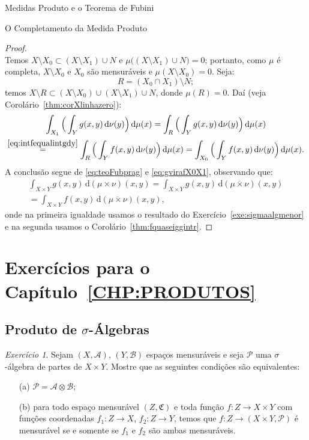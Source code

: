 \documentclass[oneside,final,11pt]{amsbook}
\newcommand{\dd}{\mathrm d}
\theoremstyle{remark}\newtheorem{exercise}{Exercício}[chapter]
\theoremstyle{remark}\newtheorem{*exercise}[exercise]{\hbox to 0pt{\hskip 0pt minus 1fil*}Exercício}
\theoremstyle{definition}\newtheorem{exdefin}{Definição}[chapter]
\theoremstyle{plain}\newtheorem{teo}{Teorema}[section]
\theoremstyle{plain}\newtheorem{lem}[teo]{Lema}
\theoremstyle{plain}\newtheorem{prop}[teo]{Proposição}
\theoremstyle{plain}\newtheorem{cor}[teo]{Corolário}
\theoremstyle{definition}\newtheorem{defin}[teo]{Definição}
\theoremstyle{remark}\newtheorem{rem}[teo]{Observação}
\theoremstyle{definition}\newtheorem{notation}[teo]{Notação}
\theoremstyle{definition}\newtheorem{convention}[teo]{Convenção}
\theoremstyle{definition}\newtheorem{example}[teo]{Exemplo}
\numberwithin{section}{chapter}
\numberwithin{equation}{section}
\begin{document}
\begin{chapter}{Medidas Produto e o Teorema de Fubini}
\begin{section}{O Completamento da Medida Produto}
\begin{proof}
\begin{equation}
\end{equation}
Temos $X\setminus X_0\subset(X\setminus X_1)\cup N$ e $\mu\big((X\setminus X_1)\cup N\big)=0$; portanto,
como $\mu$ é completa, $X\setminus X_0$ e $X_0$ são mensuráveis e $\mu(X\setminus X_0)=0$. Seja:
\[R=(X_0\cap X_1)\setminus N;\]
temos $X\setminus R\subset(X\setminus X_0)\cup(X\setminus X_1)\cup N$,
donde $\mu(R)=0$. Daí (veja Corolário~\ref{thm:corXlinhazero}):
\begin{multline}\label{eq:gvirafX0X1}
\int_{X_1}\Big(\int_Yg(x,y)\,\dd\nu(y)\Big)\,\dd\mu(x)=
\int_R\Big(\int_Yg(x,y)\,\dd\nu(y)\Big)\,\dd\mu(x)\\
\stackrel{\eqref{eq:intfequalintgdy}}=\int_R\Big(\int_Yf(x,y)\,\dd\nu(y)\Big)\,\dd\mu(x)=
\int_{X_0}\Big(\int_Yf(x,y)\,\dd\nu(y)\Big)\,\dd\mu(x).
\end{multline}
A conclusão segue de \eqref{eq:teoFubprag} e \eqref{eq:gvirafX0X1}, observando que:
\begin{multline*}
\int_{X\times Y}g(x,y)\,\dd(\mu\times\nu)(x,y)=
\int_{X\times Y}g(x,y)\,\dd(\overline{\mu\times\nu})(x,y)\\
=\int_{X\times Y}f(x,y)\,\dd(\overline{\mu\times\nu})(x,y),
\end{multline*}
onde na primeira igualdade usamos o resultado do Exercício~\ref{exe:sigmaalgmenor}
e na segunda usamos o Corolário~\ref{thm:fquaseiggintr}.
\end{proof}
\end{section}

\section*{Exercícios para o Capítulo~\ref{CHP:PRODUTOS}}

\subsection*{Produto de ${\sigma}$-Álgebras}

\begin{exercise}\label{exe:universalprod}
Sejam $(X,\mathcal A)$, $(Y,\mathcal B)$ espaços mensuráveis e seja $\mathcal P$ uma
$\sigma$-álgebra de partes de $X\times Y$. Mostre que as seguintes condições
são equivalentes:
\begin{itemize}
\item[(a)] $\mathcal P=\mathcal A\otimes\mathcal B$;
\item[(b)] para todo espaço mensurável $(Z,\mathfrak C)$ e toda função
$f:Z\to X\times Y$ com funções coordenadas $f_1:Z\to X$, $f_2:Z\to Y$, temos que
$f:Z\to(X\times Y,\mathcal P)$ é mensurável se e somente se $f_1$ e $f_2$ são ambas mensuráveis.
\end{itemize}
\end{exercise}


\end{chapter}
\end{document}

